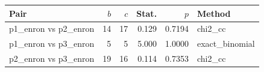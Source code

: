 \begin{tabular}{lrrrrl}
\toprule
Pair & $b$ & $c$ & Stat. & $p$ & Method \\
\midrule
p1_enron vs p2_enron & 14 & 17 & 0.129 & 0.7194 & chi2\_cc \\
p1_enron vs p3_enron & 5 & 5 & 5.000 & 1.0000 & exact\_binomial \\
p2_enron vs p3_enron & 19 & 16 & 0.114 & 0.7353 & chi2\_cc \\
\bottomrule
\end{tabular}

